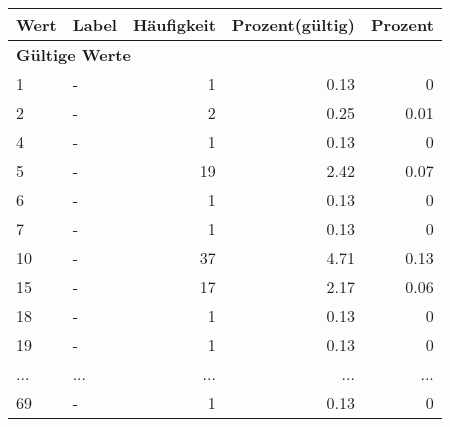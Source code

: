      \begin{longtable}{lXrrr}
     \toprule
     \textbf{Wert} & \textbf{Label} & \textbf{Häufigkeit} & \textbf{Prozent(gültig)} & \textbf{Prozent} \\
     \endhead
     \midrule
     \multicolumn{5}{l}{\textbf{Gültige Werte}}\\
        1 & \multicolumn{1}{X}{-} & %
          \num{1} &
          \num[round-mode=places,round-precision=2]{0.13} &
          \num[round-mode=places,round-precision=2]{0} \\
        2 & \multicolumn{1}{X}{-} & %
          \num{2} &
          \num[round-mode=places,round-precision=2]{0.25} &
          \num[round-mode=places,round-precision=2]{0.01} \\
        4 & \multicolumn{1}{X}{-} & %
          \num{1} &
          \num[round-mode=places,round-precision=2]{0.13} &
          \num[round-mode=places,round-precision=2]{0} \\
        5 & \multicolumn{1}{X}{-} & %
          \num{19} &
          \num[round-mode=places,round-precision=2]{2.42} &
          \num[round-mode=places,round-precision=2]{0.07} \\
        6 & \multicolumn{1}{X}{-} & %
          \num{1} &
          \num[round-mode=places,round-precision=2]{0.13} &
          \num[round-mode=places,round-precision=2]{0} \\
        7 & \multicolumn{1}{X}{-} & %
          \num{1} &
          \num[round-mode=places,round-precision=2]{0.13} &
          \num[round-mode=places,round-precision=2]{0} \\
        10 & \multicolumn{1}{X}{-} & %
          \num{37} &
          \num[round-mode=places,round-precision=2]{4.71} &
          \num[round-mode=places,round-precision=2]{0.13} \\
        15 & \multicolumn{1}{X}{-} & %
          \num{17} &
          \num[round-mode=places,round-precision=2]{2.17} &
          \num[round-mode=places,round-precision=2]{0.06} \\
        18 & \multicolumn{1}{X}{-} & %
          \num{1} &
          \num[round-mode=places,round-precision=2]{0.13} &
          \num[round-mode=places,round-precision=2]{0} \\
        19 & \multicolumn{1}{X}{-} & %
          \num{1} &
          \num[round-mode=places,round-precision=2]{0.13} &
          \num[round-mode=places,round-precision=2]{0} \\
       ... & ... & ... & ... & ... \\
        69 & \multicolumn{1}{X}{-} & %
          \num{1} &
          \num[round-mode=places,round-precision=2]{0.13} &
          \num[round-mode=places,round-precision=2]{0} \\


\end{longtable}
